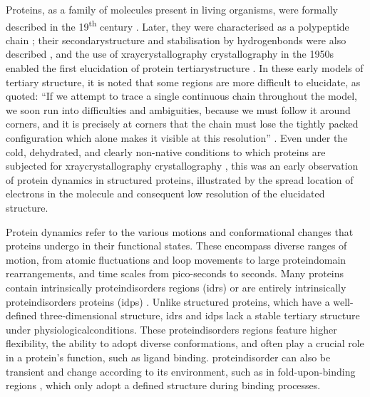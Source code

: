 Proteins, as a family of molecules present in living organisms, were formally described in the 19\textsuperscript{th} century \cite{natural_history_museum_library_sur_1838, hartley_origin_1951}. Later, they were characterised as a polypeptide chain \cite{dill_dominant_1990, gutte_peptides_1995}; their \gls{secondarystructure} and stabilisation by \glspl{hydrogenbond} were also described \cite{astbury_molecular_1931, pauling_atomic_1951, pauling_structure_1951}, and the use of \gls{xraycrystallography} crystallography in the 1950s enabled the first elucidation of protein \gls{tertiarystructure} \cite{kendrew_three-dimensional_1958, perutz_structure_1960}. In these early models of tertiary structure, it is noted that some regions are more difficult to elucidate, as quoted: ``If we attempt to trace a single continuous chain throughout the model, we soon run into difficulties and ambiguities, because we must follow it around corners, and it is precisely at corners that the chain must lose the tightly packed configuration which alone makes it visible at this resolution'' \cite{kendrew_three-dimensional_1958}. Even under the cold, dehydrated, and clearly non-native conditions to which proteins are subjected for \gls{xraycrystallography} crystallography \cite{fenwick_integrated_2014}, this was an early observation of protein \gls{dynamics} in structured proteins, illustrated by the spread location of \glspl{electron} in the molecule and consequent low resolution of the elucidated structure.

Protein \gls{dynamics} refer to the various motions and conformational changes that proteins undergo in their functional states. These encompass diverse ranges of motion, from atomic fluctuations and loop movements to large \gls{proteindomain} rearrangements, and time scales from pico-seconds to seconds. Many proteins contain intrinsically \glspl{proteindisorder} regions (\glspl{idr}) or are entirely intrinsically \glspl{proteindisorder} proteins (\glspl{idp}) \cite{tompa_intrinsically_2002, aspromonte_disprot_2024}. Unlike structured proteins, which have a well-defined three-dimensional structure, \glspl{idr} and \glspl{idp} lack a stable tertiary structure under \gls{physiologicalconditions}. These \glspl{proteindisorder} regions feature higher \gls{flexibility}, the ability to adopt diverse \glspl{conformation}, and often play a crucial role in a protein's function, such as \gls{ligand} binding. \Gls{proteindisorder} can also be transient and change according to its environment, such as in fold-upon-binding regions \cite{tsai_folding_1999, wright_linking_2009, fuxreiter_fold_2019}, which only adopt a defined structure during binding processes.

